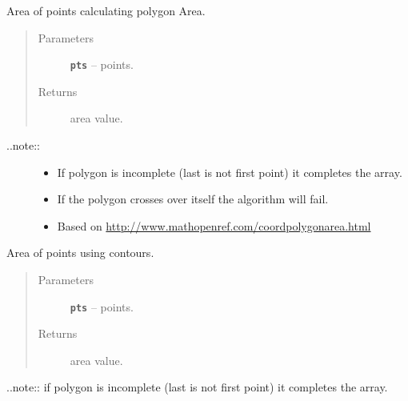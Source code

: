 \documentclass[letterpaper,10pt,english]{sphinxmanual}
\begin{document}
\begin{fulllineitems}
\label{RRtoolbox.lib.arrayops:RRtoolbox.lib.arrayops.basic.polygonArea_calcule}
Area of points calculating polygon Area.
\begin{quote}\begin{description}
\item[{Parameters}] \leavevmode
\textbf{\texttt{pts}} -- points.

\item[{Returns}] \leavevmode
area value.

\end{description}\end{quote}
\begin{description}
\item[{..note::}] \leavevmode\begin{itemize}
\item {} 
If polygon is incomplete (last is not first point) it completes the array.

\item {} 
If the polygon crosses over itself the algorithm will fail.

\item {} 
Based on \href{http://www.mathopenref.com/coordpolygonarea.html}{http://www.mathopenref.com/coordpolygonarea.html}

\end{itemize}

\end{description}

\end{fulllineitems}


\begin{fulllineitems}
\label{RRtoolbox.lib.arrayops:RRtoolbox.lib.arrayops.basic.polygonArea_contour}
Area of points using contours.
\begin{quote}\begin{description}
\item[{Parameters}] \leavevmode
\textbf{\texttt{pts}} -- points.

\item[{Returns}] \leavevmode
area value.

\end{description}\end{quote}

..note:: if polygon is incomplete (last is not first point) it completes the array.

\end{fulllineitems}
\end{document}
